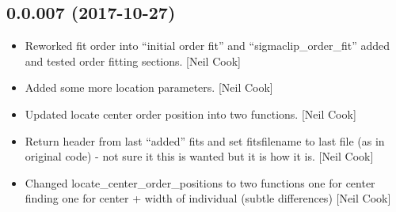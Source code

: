 \documentclass[a4paper,10pt,english]{report}
\begin{document}
\subsection{0.0.007 (2017-10-27)}
\label{\detokenize{misc/changelog:id542}}\begin{itemize}
\item {} 
Reworked fit order into “initial order fit” and “sigmaclip\_order\_fit”
added and tested order fitting sections. {[}Neil Cook{]}

\item {} 
Added some more location parameters. {[}Neil Cook{]}

\item {} 
Updated locate center order position into two functions. {[}Neil Cook{]}

\item {} 
Return header from last “added” fits and set fitsfilename to last file
(as in original code) - not sure it this is wanted but it is how it
is. {[}Neil Cook{]}

\item {} 
Changed locate\_center\_order\_positions to two functions one for center
finding one for center + width of individual (subtle differences)
{[}Neil Cook{]}

\end{itemize}
\end{document}
